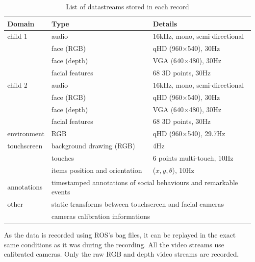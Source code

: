 \documentclass{article}
\begin{document}
\begin{table}[]
\centering
\caption{List of datastreams stored in each record}
\label{table|datastreams}
\begin{tabular}{@{}lll@{}}
\toprule
\bf Domain  & \bf Type                              & \bf Details                          \\ \midrule
child 1     & audio                                 & 16kHz, mono, semi-directional        \\
            & face (RGB)                            & qHD (960$\times$540), 30Hz           \\
            & face (depth)                          & VGA (640$\times$480), 30Hz           \\
            & facial features                       & 68 3D points, 30Hz                   \\ \midrule
child 2     & audio                                 & 16kHz, mono, semi-directional        \\
            & face (RGB)                            & qHD (960$\times$540), 30Hz           \\
            & face (depth)                          & VGA (640$\times$480), 30Hz           \\
            & facial features                       & 68 3D points, 30Hz                   \\ \midrule
environment & RGB                                   & qHD (960$\times$540), 29.7Hz         \\ \midrule
touchscreen & background drawing (RGB)              & 4Hz                                  \\
            & touches                               & 6 points multi-touch, 10Hz           \\
            & items position and orientation        & ($x,y,\theta$), 10Hz                 \\ \midrule
annotations & \multicolumn{2}{l}{timestamped annotations of social behaviours and remarkable events}   \\ \midrule
other       & \multicolumn{2}{l}{static transforms between touchscreen and facial cameras} \\
            & \multicolumn{2}{l}{cameras calibration informations}                         \\ \bottomrule
\end{tabular}
\end{table}

As the data is recorded using ROS's bag files, it can be replayed in the exact
same conditions as it was during the recording. All the video streams use
calibrated cameras. Only the raw RGB and depth video streams are recorded. 
\end{document}
